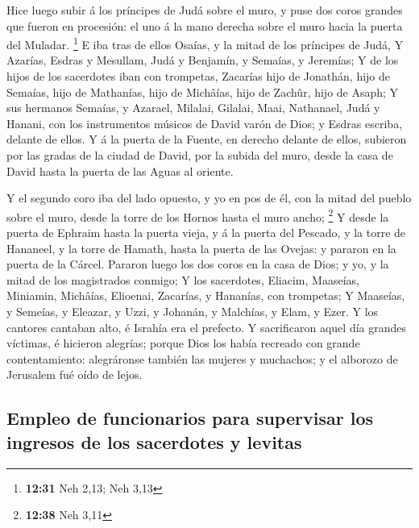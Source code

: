  Hice luego subir á los príncipes de Judá sobre el muro, y
puse dos coros grandes que fueron en procesión: el uno á la mano derecha
sobre el muro hacia la puerta del Muladar. \footnote{\textbf{12:31} Neh
  2,13; Neh 3,13}  E iba tras de ellos Osaías, y la mitad
de los príncipes de Judá,  Y Azarías, Esdras y Mesullam,
 Judá y Benjamín, y Semaías, y Jeremías;  Y de
los hijos de los sacerdotes iban con trompetas, Zacarías hijo de
Jonathán, hijo de Semaías, hijo de Mathanías, hijo de Michâías, hijo de
Zachûr, hijo de Asaph;  Y sus hermanos Semaías, y Azarael,
Milalai, Gilalai, Maai, Nathanael, Judá y Hanani, con los instrumentos
músicos de David varón de Dios; y Esdras escriba, delante de ellos.
 Y á la puerta de la Fuente, en derecho delante de ellos,
subieron por las gradas de la ciudad de David, por la subida del muro,
desde la casa de David hasta la puerta de las Aguas al oriente.

 Y el segundo coro iba del lado opuesto, y yo en pos de él,
con la mitad del pueblo sobre el muro, desde la torre de los Hornos
hasta el muro ancho; \footnote{\textbf{12:38} Neh 3,11}  Y
desde la puerta de Ephraim hasta la puerta vieja, y á la puerta del
Pescado, y la torre de Hananeel, y la torre de Hamath, hasta la puerta
de las Ovejas: y pararon en la puerta de la Cárcel. 
Pararon luego los dos coros en la casa de Dios; y yo, y la mitad de los
magistrados conmigo;  Y los sacerdotes, Eliacim, Maaseías,
Miniamin, Michâías, Elioenai, Zacarías, y Hananías, con trompetas;
 Y Maaseías, y Semeías, y Eleazar, y Uzzi, y Johanán, y
Malchías, y Elam, y Ezer. Y los cantores cantaban alto, é Israhía era el
prefecto.  Y sacrificaron aquel día grandes víctimas, é
hicieron alegrías; porque Dios los había recreado con grande
contentamiento: alegráronse también las mujeres y muchachos; y el
alborozo de Jerusalem fué oído de lejos.

\hypertarget{empleo-de-funcionarios-para-supervisar-los-ingresos-de-los-sacerdotes-y-levitas}{%
\subsection{Empleo de funcionarios para supervisar los ingresos de los
sacerdotes y
levitas}\label{empleo-de-funcionarios-para-supervisar-los-ingresos-de-los-sacerdotes-y-levitas}}

